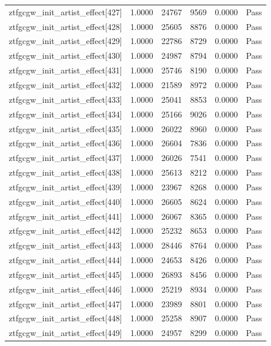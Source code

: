 \begin{table}[htbp]
\begin{tabular}{llrrll}
ztfgcgw\_init\_artist\_effect[427] & 1.0000 & 24767 & 9569 & 0.0000 & Pass \\
ztfgcgw\_init\_artist\_effect[428] & 1.0000 & 25605 & 8876 & 0.0000 & Pass \\
ztfgcgw\_init\_artist\_effect[429] & 1.0000 & 22786 & 8729 & 0.0000 & Pass \\
ztfgcgw\_init\_artist\_effect[430] & 1.0000 & 24987 & 8794 & 0.0000 & Pass \\
ztfgcgw\_init\_artist\_effect[431] & 1.0000 & 25746 & 8190 & 0.0000 & Pass \\
ztfgcgw\_init\_artist\_effect[432] & 1.0000 & 21589 & 8972 & 0.0000 & Pass \\
ztfgcgw\_init\_artist\_effect[433] & 1.0000 & 25041 & 8853 & 0.0000 & Pass \\
ztfgcgw\_init\_artist\_effect[434] & 1.0000 & 25166 & 9026 & 0.0000 & Pass \\
ztfgcgw\_init\_artist\_effect[435] & 1.0000 & 26022 & 8960 & 0.0000 & Pass \\
ztfgcgw\_init\_artist\_effect[436] & 1.0000 & 26604 & 7836 & 0.0000 & Pass \\
ztfgcgw\_init\_artist\_effect[437] & 1.0000 & 26026 & 7541 & 0.0000 & Pass \\
ztfgcgw\_init\_artist\_effect[438] & 1.0000 & 25613 & 8212 & 0.0000 & Pass \\
ztfgcgw\_init\_artist\_effect[439] & 1.0000 & 23967 & 8268 & 0.0000 & Pass \\
ztfgcgw\_init\_artist\_effect[440] & 1.0000 & 26605 & 8624 & 0.0000 & Pass \\
ztfgcgw\_init\_artist\_effect[441] & 1.0000 & 26067 & 8365 & 0.0000 & Pass \\
ztfgcgw\_init\_artist\_effect[442] & 1.0000 & 25232 & 8653 & 0.0000 & Pass \\
ztfgcgw\_init\_artist\_effect[443] & 1.0000 & 28446 & 8764 & 0.0000 & Pass \\
ztfgcgw\_init\_artist\_effect[444] & 1.0000 & 24653 & 8426 & 0.0000 & Pass \\
ztfgcgw\_init\_artist\_effect[445] & 1.0000 & 26893 & 8456 & 0.0000 & Pass \\
ztfgcgw\_init\_artist\_effect[446] & 1.0000 & 25219 & 8934 & 0.0000 & Pass \\
ztfgcgw\_init\_artist\_effect[447] & 1.0000 & 23989 & 8801 & 0.0000 & Pass \\
ztfgcgw\_init\_artist\_effect[448] & 1.0000 & 25258 & 8907 & 0.0000 & Pass \\
ztfgcgw\_init\_artist\_effect[449] & 1.0000 & 24957 & 8299 & 0.0000 & Pass \\

\end{tabular}
\end{table}
